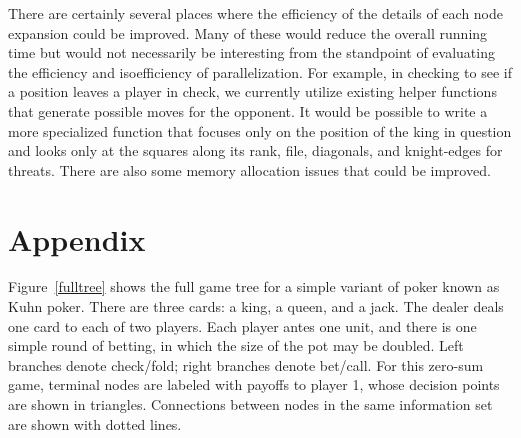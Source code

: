 \documentclass[11pt]{article}
\begin{document}
There are certainly several places where the efficiency of the details of each node expansion could be improved.  Many
of these would reduce the overall running time but would not necessarily be interesting from the standpoint of
evaluating the efficiency and isoefficiency of parallelization.  For example, in checking to see if a position leaves a
player in check, we currently utilize existing helper functions that generate possible moves for the opponent.  It would
be possible to write a more specialized function that focuses only on the position of the king in question and looks
only at the squares along its rank, file, diagonals, and knight-edges for threats.  There are also some memory
allocation issues that could be improved. 


\section{Appendix}
Figure~\ref{fulltree} shows the full game tree for a simple variant of poker known as Kuhn poker.  There are three
cards: a king, a queen, and a jack.  The dealer deals one card to each of two players.  Each player antes one unit, and
there is one simple round of betting, in which the size of the pot may be doubled.  Left branches denote check/fold;
right branches denote bet/call.  For this zero-sum game, terminal nodes are labeled with payoffs to player 1, whose
decision points are shown in triangles.  Connections between nodes in the same information set are shown with dotted
lines.
\end{document}
